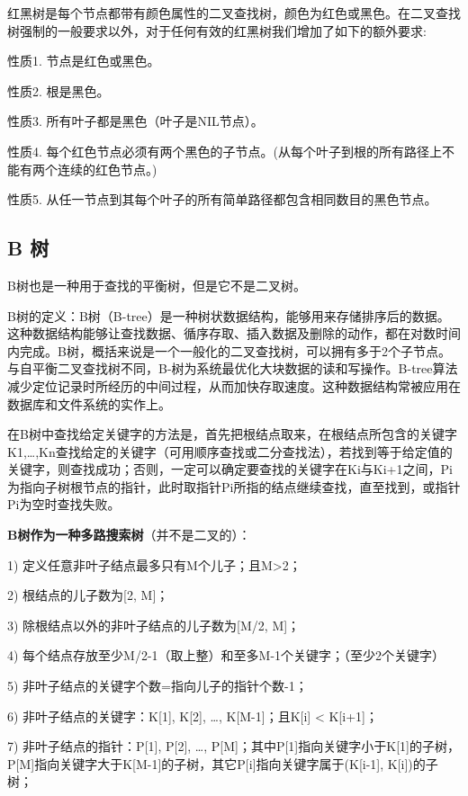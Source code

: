 \documentclass[UTF8,a4paper,12pt]{ctexbook}
\begin{document}
					红黑树是每个节点都带有颜色属性的二叉查找树，颜色为红色或黑色。在二叉查找树强制的一般要求以外，对于任何有效的红黑树我们增加了如下的额外要求:
					
					性质1. 节点是红色或黑色。
					
					性质2. 根是黑色。
					
					性质3. 所有叶子都是黑色（叶子是NIL节点）。
					
					性质4. 每个红色节点必须有两个黑色的子节点。(从每个叶子到根的所有路径上不能有两个连续的红色节点。)
					
					性质5. 从任一节点到其每个叶子的所有简单路径都包含相同数目的黑色节点。
			\subsection{B 树}
				B树也是一种用于查找的平衡树，但是它不是二叉树。
				
				B树的定义：B树（B-tree）是一种树状数据结构，能够用来存储排序后的数据。这种数据结构能够让查找数据、循序存取、插入数据及删除的动作，都在对数时间内完成。B树，概括来说是一个一般化的二叉查找树，可以拥有多于2个子节点。与自平衡二叉查找树不同，B-树为系统最优化大块数据的读和写操作。B-tree算法减少定位记录时所经历的中间过程，从而加快存取速度。这种数据结构常被应用在数据库和文件系统的实作上。
				
				在B树中查找给定关键字的方法是，首先把根结点取来，在根结点所包含的关键字K1,…,Kn查找给定的关键字（可用顺序查找或二分查找法），若找到等于给定值的关键字，则查找成功；否则，一定可以确定要查找的关键字在Ki与Ki+1之间，Pi为指向子树根节点的指针，此时取指针Pi所指的结点继续查找，直至找到，或指针Pi为空时查找失败。
				
				\textbf{B树作为一种多路搜索树}（并不是二叉的）：
				
				1) 定义任意非叶子结点最多只有M个儿子；且M>2；
				
				2) 根结点的儿子数为[2, M]；
				
				3) 除根结点以外的非叶子结点的儿子数为[M/2, M]；
				
				4) 每个结点存放至少M/2-1（取上整）和至多M-1个关键字；（至少2个关键字）
				
				5) 非叶子结点的关键字个数=指向儿子的指针个数-1；
				
				6) 非叶子结点的关键字：K[1], K[2], …, K[M-1]；且K[i] < K[i+1]；
				
				7) 非叶子结点的指针：P[1], P[2], …, P[M]；其中P[1]指向关键字小于K[1]的子树，P[M]指向关键字大于K[M-1]的子树，其它P[i]指向关键字属于(K[i-1], K[i])的子树；
				
\end{document}
